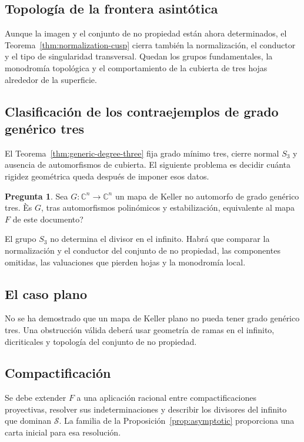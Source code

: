 \documentclass[11pt]{article}
\theoremstyle{definition}
\newtheorem{question}[theorem]{Pregunta}
\theoremstyle{remark}
\newcommand{\C}{\mathbb{C}}
\begin{document}
\subsection{Topolog\'ia de la frontera asint\'otica}

Aunque la imagen y el conjunto de no propiedad est\'an ahora determinados,
el Teorema~\ref{thm:normalization-cusp} cierra tambi\'en la normalizaci\'on, el
conductor y el tipo de singularidad transversal. Quedan los grupos
fundamentales, la monodrom\'ia topol\'ogica y el comportamiento de la cubierta
de tres hojas alrededor de la superficie.

\subsection{Clasificaci\'on de los contraejemplos de grado gen\'erico tres}

El Teorema~\ref{thm:generic-degree-three} fija grado m\'inimo tres, cierre
normal $S_3$ y ausencia de automorfismos de cubierta. El siguiente problema es
decidir cu\'anta rigidez geom\'etrica queda despu\'es de imponer esos datos.

\begin{question}
Sea $G\colon\C^n\to\C^n$ un mapa de Keller no automorfo de grado gen\'erico
tres. \`Es $G$, tras automorfismos polin\'omicos y estabilizaci\'on, equivalente
al mapa $F$ de este documento?
\end{question}

El grupo $S_3$ no determina el divisor en el infinito. Habr\'a que comparar la
normalizaci\'on y el conductor del conjunto de no propiedad, las componentes
omitidas, las valuaciones que pierden hojas y la monodrom\'ia local.

\subsection{El caso plano}

No se ha demostrado que un mapa de Keller plano no pueda tener grado
gen\'erico tres. Una obstrucci\'on v\'alida deber\'a usar geometr\'ia de ramas en
el infinito, dicriticales y topolog\'ia del conjunto de no propiedad.

\subsection{Compactificaci\'on}

Se debe extender $F$ a una aplicaci\'on racional entre compactificaciones
proyectivas, resolver sus indeterminaciones y describir los divisores del
infinito que dominan $\mathcal S$. La familia de la
Proposici\'on~\ref{prop:asymptotic} proporciona una carta inicial para esa
resoluci\'on.
\end{document}
